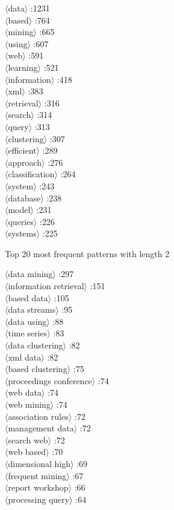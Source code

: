 \documentclass[11pt,a4paper,fleqn]{article}
\begin{document}
\begin{multicols}{4} \noindent 
$\langle$data$\rangle$ :1231\\
$\langle$based$\rangle$ :764\\
$\langle$mining$\rangle$ :665\\
$\langle$using$\rangle$ :607\\
$\langle$web$\rangle$ :591\\
$\langle$learning$\rangle$ :521\\
$\langle$information$\rangle$ :418\\
$\langle$xml$\rangle$ :383\\
$\langle$retrieval$\rangle$ :316\\
$\langle$search$\rangle$ :314\\
$\langle$query$\rangle$ :313\\
$\langle$clustering$\rangle$ :307\\
$\langle$efficient$\rangle$ :289\\
$\langle$approach$\rangle$ :276\\
$\langle$classification$\rangle$ :264\\
$\langle$system$\rangle$ :243\\
$\langle$database$\rangle$ :238\\
$\langle$model$\rangle$ :231\\
$\langle$queries$\rangle$ :226\\
$\langle$systems$\rangle$ :225\\
\end{multicols} \noindent
Top 20 most frequent patterns with length 2
\begin{multicols}{3} \noindent
$\langle$data mining$\rangle$ :297\\
$\langle$information retrieval$\rangle$ :151\\
$\langle$based data$\rangle$ :105\\
$\langle$data streams$\rangle$ :95\\
$\langle$data using$\rangle$ :88\\
$\langle$time series$\rangle$ :83\\
$\langle$data clustering$\rangle$ :82\\
$\langle$xml data$\rangle$ :82\\
$\langle$based clustering$\rangle$ :75\\
$\langle$proceedings conference$\rangle$ :74\\
$\langle$web data$\rangle$ :74\\
$\langle$web mining$\rangle$ :74\\
$\langle$association rules$\rangle$ :72\\
$\langle$management data$\rangle$ :72\\
$\langle$search web$\rangle$ :72\\
$\langle$web based$\rangle$ :70\\
$\langle$dimensional high$\rangle$ :69\\
$\langle$frequent mining$\rangle$ :67\\
$\langle$report workshop$\rangle$ :66\\
$\langle$processing query$\rangle$ :64\\
\end{multicols} \noindent
\end{document}
